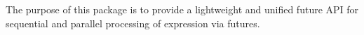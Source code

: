     The purpose of this package is to provide a lightweight and unified
    future API for sequential and parallel processing of \R expression via
    futures.
